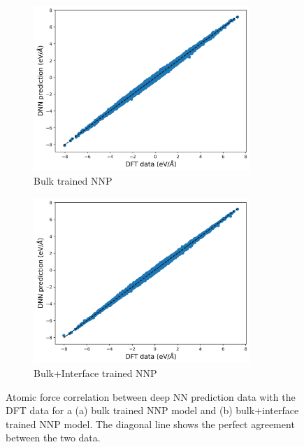 \clearpage

\begin{figure}[tbhp!]
	\centering
	\begin{subfigure}{0.47\textwidth}
		\centering

		\includegraphics[width=0.9\textwidth]{images/bulk_NN_on_interface/2_force.png}
		\caption{Bulk trained NNP}
		\label{fig:corr_bulk_NN_F}
	\end{subfigure}
	\hfill
	\begin{subfigure}{0.47\textwidth}
		\centering

		\includegraphics[width=0.9\textwidth]{images/bulk+interface_NN_on_interface/2_force.png}
		\caption{Bulk+Interface trained NNP}
		\label{fig:corr_bulk+interface_NN_F}
	\end{subfigure}
	\caption{Atomic force correlation between deep NN prediction data with
		the DFT data
		for a
		(a) bulk trained NNP model and (b) bulk+interface trained NNP
		model. The
		diagonal line shows the perfect agreement between the two
		data.}
	\label{fig:corr_F}
\end{figure}

